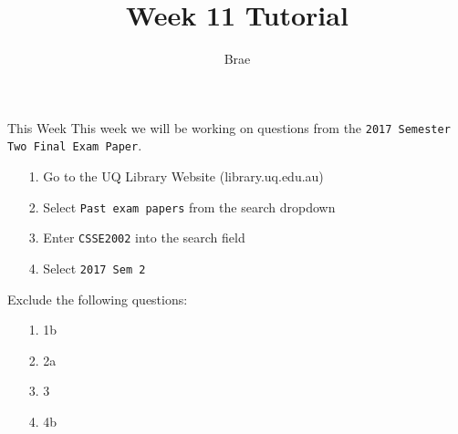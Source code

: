 

\title{Week 11 Tutorial}
\author{Brae}



\begin{frame}
\titlepage
\end{frame}

\begin{frame}[t, fragile]{This Week} \vspace{4pt}
This week we will be working on questions from the \texttt{2017 Semester Two Final Exam Paper}.\\[20pt]
\begin{enumerate}
	\item[1.] Go to the UQ Library Website (library.uq.edu.au)
	\item[2.] Select \texttt{Past exam papers} from the search dropdown
	\item[3.] Enter \texttt{CSSE2002} into the search field
	\item[4.] Select \texttt{2017 Sem 2}
\end{enumerate}

Exclude the following questions:
\begin{enumerate}
	\item[1.] 1b
	\item[2.] 2a
	\item[3.] 3
	\item[4.] 4b
\end{enumerate}
\end{frame}

